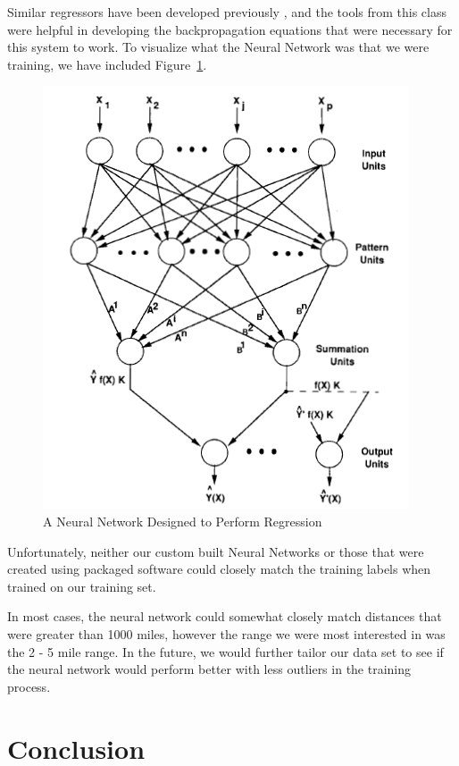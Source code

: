 \documentclass[10pt,twocolumn,letterpaper]{article}
\begin{document}
Similar regressors have been developed previously
\cite{Neural_Network_Regression}, and the tools from this class were helpful in
developing the backpropagation equations that were necessary for this system to
work. To visualize what the Neural Network was that we were training, we have
included Figure~\ref{fig:regression_nn}.

\begin{figure}
  \centering
  \includegraphics[width=0.9\linewidth]{regression_nn}
  \caption{A Neural Network Designed to Perform Regression}
\label{fig:regression_nn}
\end{figure}

Unfortunately, neither our custom built Neural Networks or those that were
created using packaged software could closely match the training labels when
trained on our training set.

In most cases, the neural network could somewhat closely match distances that
were greater than 1000 miles, however the range we were most interested in was
the 2 - 5 mile range. In the future, we would further tailor our data set to see
if the neural network would perform better with less outliers in the training
process.

\section{Conclusion}
\end{document}
